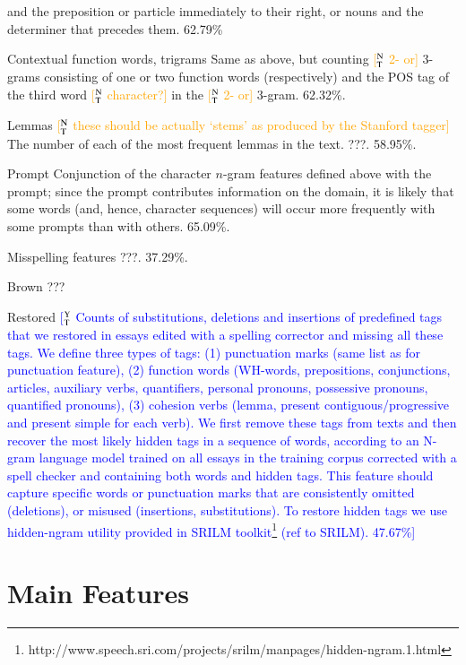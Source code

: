 \documentclass[11pt,letterpaper]{article}
\newcommand{\ensuretext}[1]{#1}
\newcommand{\ytmarker}{\ensuretext{\textcolor{blue}{\ensuremath{^{\textsc{Y}}_{\textsc{T}}}}}}
\newcommand{\ntmarker}{\ensuretext{\textcolor{green}{\ensuremath{^{\textsc{N}}_{\textsc{T}}}}}}
\newcommand{\arkcomment}[3]{\ensuretext{\textcolor{#3}{[#1 #2]}}}
\newcommand{\yt}[1]{\arkcomment{\ytmarker}{#1}{blue}}
\newcommand{\nt}[1]{\arkcomment{\ntmarker}{#1}{orange}}
\begin{document}
\begin{compactdesc}
  and the preposition or particle immediately to their right, or nouns
  and the determiner that precedes them. 62.79\%
\item[Contextual function words, trigrams] Same as above, but counting
  \nt{2- or} 3-grams consisting of one or two function words (respectively) and the POS tag of the third word \nt{character?} in the \nt{2- or} 3-gram. 62.32\%.
\item[Lemmas] \nt{these should be actually `stems' as produced by the Stanford tagger} The number of each of the most frequent lemmas in the
  text. ???. 58.95\%.
\item[Prompt] Conjunction of the character $n$-gram features defined
  above with the prompt; since the prompt contributes information on
  the domain, it is likely that some words (and, hence, character
  sequences) will occur more frequently with some prompts than with
  others. 65.09\%.
\item[Misspelling features] ???. 37.29\%.
\item[Brown] ???
\item[Restored] \yt{Counts of substitutions, deletions and insertions of predefined tags that we restored in essays edited with a spelling  corrector and missing all these tags. We define three types of tags: (1) punctuation marks (same list as for punctuation feature), (2) function words (WH-words, prepositions, conjunctions, articles, auxiliary verbs, quantifiers, personal pronouns, possessive pronouns, quantified pronouns), (3) cohesion verbs (lemma, present contiguous/progressive and present simple for each verb). We first remove these tags from texts and then recover the most likely hidden tags in a sequence of words, according to an N-gram language model trained on all essays in the training corpus corrected with a spell checker and containing both words and hidden tags. This feature should capture specific words or punctuation marks that are consistently omitted (deletions), or misused (insertions, substitutions).  To restore hidden tags we use hidden-ngram utility provided in SRILM toolkit\footnote{http://www.speech.sri.com/projects/srilm/manpages/hidden-ngram.1.html} (ref to SRILM). 47.67\%}


\end{compactdesc}

\section{Main Features}\label{sec:mainfeats}
\end{document}

